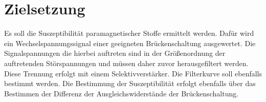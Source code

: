 \section{Zielsetzung}
\label{sec:Zielsetzung}

Es soll die Suszeptibilität paramagnetischer Stoffe ermittelt werden.
Dafür wird ein Wechselspannungssignal einer geeigneten Brückenschaltung ausgewertet.
Die Signalspannungen die hierbei auftreten sind in der Größenordnung der auftretenden Störspannungen und müssen daher zuvor herausgefiltert werden.
Diese Trennung erfolgt mit einem Selektivverstärker.
Die Filterkurve soll ebenfalls bestimmt werden.
Die Bestimmung der Suszeptibilität erfolgt ebenfalls über das Bestimmen der Differenz der Ausgleichswiderstände der Brückenschaltung.
